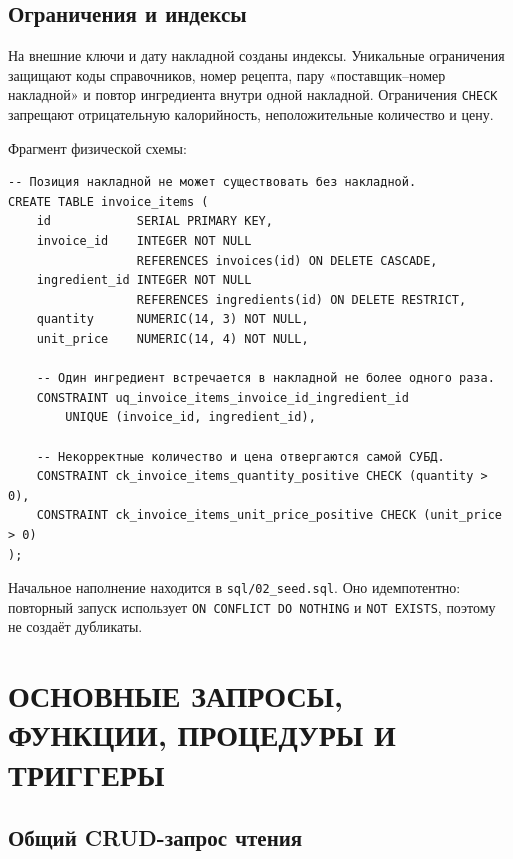 \documentclass[14pt,a4paper]{extarticle}
\begin{document}
\subsection{Ограничения и индексы}

На внешние ключи и дату накладной созданы индексы. Уникальные ограничения
защищают коды справочников, номер рецепта, пару «поставщик--номер накладной» и
повтор ингредиента внутри одной накладной. Ограничения \texttt{CHECK}
запрещают отрицательную калорийность, неположительные количество и цену.

Фрагмент физической схемы:

\begin{verbatim}
-- Позиция накладной не может существовать без накладной.
CREATE TABLE invoice_items (
    id            SERIAL PRIMARY KEY,
    invoice_id    INTEGER NOT NULL
                  REFERENCES invoices(id) ON DELETE CASCADE,
    ingredient_id INTEGER NOT NULL
                  REFERENCES ingredients(id) ON DELETE RESTRICT,
    quantity      NUMERIC(14, 3) NOT NULL,
    unit_price    NUMERIC(14, 4) NOT NULL,

    -- Один ингредиент встречается в накладной не более одного раза.
    CONSTRAINT uq_invoice_items_invoice_id_ingredient_id
        UNIQUE (invoice_id, ingredient_id),

    -- Некорректные количество и цена отвергаются самой СУБД.
    CONSTRAINT ck_invoice_items_quantity_positive CHECK (quantity > 0),
    CONSTRAINT ck_invoice_items_unit_price_positive CHECK (unit_price > 0)
);
\end{verbatim}

Начальное наполнение находится в \texttt{sql/02\_seed.sql}. Оно идемпотентно:
повторный запуск использует \texttt{ON CONFLICT DO NOTHING} и
\texttt{NOT EXISTS}, поэтому не создаёт дубликаты.

\clearpage
\section{ОСНОВНЫЕ ЗАПРОСЫ, ФУНКЦИИ, ПРОЦЕДУРЫ И ТРИГГЕРЫ}

\subsection{Общий CRUD-запрос чтения}
\end{document}
